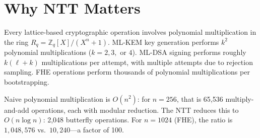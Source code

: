 \section{Why NTT Matters}


Every lattice-based cryptographic operation involves polynomial multiplication in the ring
$R_q = \mathbb{Z}_q[X]/(X^n + 1)$. ML-KEM key generation performs $k^2$ polynomial
multiplications ($k = 2, 3,$ or $4$). ML-DSA signing performs roughly $k(\ell + k)$
multiplications per attempt, with multiple attempts due to rejection sampling. FHE
operations perform thousands of polynomial multiplications per bootstrapping.

Naive polynomial multiplication is $O(n^2)$: for $n = 256$, that is 65,536 multiply-and-add
operations, each with modular reduction. The NTT reduces this to $O(n \log n)$: 2,048
butterfly operations. For $n = 1024$ (FHE), the ratio is $1{,}048{,}576$ vs.\ $10{,}240$---a
factor of 100.

